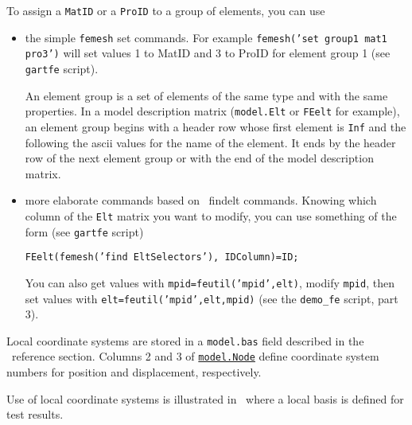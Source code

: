 To assign a {\tt MatID} or a {\tt ProID} to a group of elements, you can use 

\begin{itemize}
\item the simple {\tt femesh} set commands. For example {\tt femesh('set group1 mat1 pro3')} will set values 1 to MatID and 3 to ProID for element group 1 (see {\tt gartfe} script).

An element group is a set of elements of the same type and with the same properties. In a model description matrix ({\tt model.Elt} or {\tt FEelt} for example), an element group begins with a header row whose first element is {\tt Inf} and the following the ascii values for the name of the element. It ends by the header row of the next element group or with the end of the model description matrix.

\item more elaborate commands based on \femesh\ findelt commands. Knowing which column of the {\tt Elt} matrix you want to modify, you can use something of the form (see {\tt gartfe} script)

{\tt FEelt(femesh('find {\ti EltSelectors}'), {\ti IDColumn})={\ti ID};}

You can also get values with {\tt mpid=feutil('mpid',elt)}, modify {\tt mpid}, then set values with {\tt elt=feutil('mpid',elt,mpid)} (see the {\tt demo\_fe} script, part 3).

\end{itemize}

\newpage

Local coordinate systems are stored in a {\tt model.bas} field described in the \basis\ reference section. Columns 2 and 3 of \hyperlink{node}{{\tt model.Node}} define coordinate system numbers for position and displacement, respectively. 

\begin{SDT}
Use of local coordinate systems is illustrated in~ where a local basis is defined for test results.
\end{SDT}

